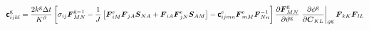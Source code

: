 \documentclass[10pt,letterpaper,oneside]{report}
\newcommand{\ten}[1]{\mbox{\boldmath $#1$}{}}
\newcommand{\tenf}[1]{\mbox{{\sffamily{\bfseries {#1}}}}}
\newcommand{\scas}[1]{\mbox{{\scriptsize{${\rm{#1}}$}}}{}}
\begin{document}
\begin{align}
\tenf{c}^{\scas{g}}_{ijkl} 
={}& \frac{2 k^{\scas{g}} \Delta t}{K^\vartheta} \left[ \sigma_{ij} \ten{F}^{\scas{g}-1}_{MN} 
- \frac{1}{J} \left[ \ten{F}^{\scas{e}}_{iM} \ten{F}_{jA} \ten{S}_{NA} + \ten{F}_{iA} \ten{F}^{\scas{e}}_{jN} \ten{S}_{AM} \right]
- \tenf{c}^{\scas{e}}_{ijmn} \ten{F}^{\scas{e}}_{mM} \ten{F}^{-1}_{Nn} \right] 
\frac{\partial \ten{F}^{\scas{g}}_{MN}}{\partial \vartheta^{\scas{g}}} \left. \frac{\partial \phi^{\scas{g}} }{\partial \ten{C}_{KL}} \right|_{\vartheta^{\scas{g}}} \ten{F}_{kK} \ten{F}_{lL} 
\notag \\

\end{align}
\end{document}

